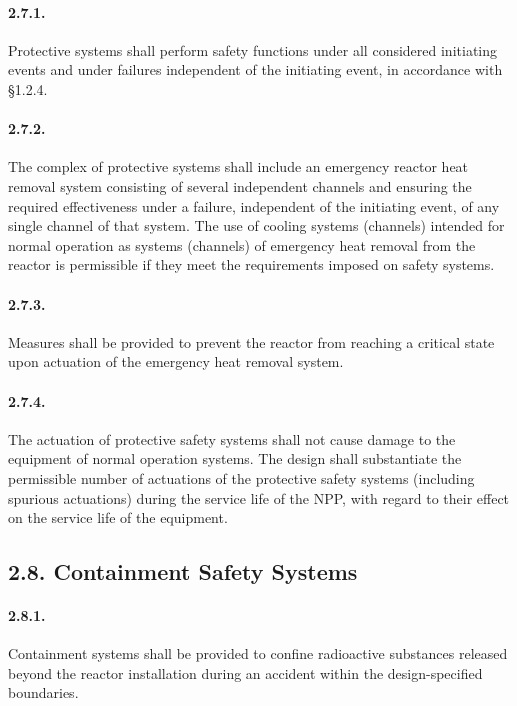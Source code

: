 \documentclass[openright]{bookest}
\begin{document}
\paragraph{2.7.1.}
Protective systems shall perform safety functions under all considered initiating events and under failures independent of the initiating event, in accordance with §1.2.4.

\paragraph{2.7.2.}
The complex of protective systems shall include an emergency reactor heat removal system consisting of several independent channels and ensuring the required effectiveness under a failure, independent of the initiating event, of any single channel of that system.  
The use of cooling systems (channels) intended for normal operation as systems (channels) of emergency heat removal from the reactor is permissible if they meet the requirements imposed on safety systems.

\paragraph{2.7.3.}
Measures shall be provided to prevent the reactor from reaching a critical state upon actuation of the emergency heat removal system.

\paragraph{2.7.4.}
The actuation of protective safety systems shall not cause damage to the equipment of normal operation systems.  
The design shall substantiate the permissible number of actuations of the protective safety systems (including spurious actuations) during the service life of the NPP, with regard to their effect on the service life of the equipment.

\subsection*{2.8. Containment Safety Systems}

\paragraph{2.8.1.}
Containment systems shall be provided to confine radioactive substances released beyond the reactor installation during an accident within the design-specified boundaries.
\end{document}

